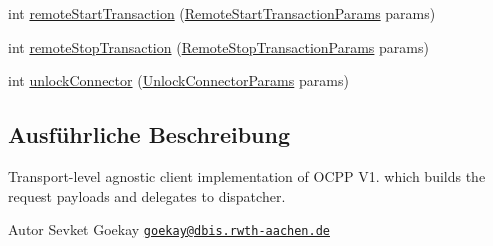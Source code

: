 \begin{DoxyCompactItemize}
\item 
int \hyperlink{classde_1_1rwth_1_1idsg_1_1steve_1_1service_1_1_charge_point_service12___client_a699443166e440f7e34a46206fb2166ef}{remote\-Start\-Transaction} (\hyperlink{classde_1_1rwth_1_1idsg_1_1steve_1_1web_1_1dto_1_1common_1_1_remote_start_transaction_params}{Remote\-Start\-Transaction\-Params} params)
\item 
int \hyperlink{classde_1_1rwth_1_1idsg_1_1steve_1_1service_1_1_charge_point_service12___client_af7c5fa9d8e585e8e061feaf76569de72}{remote\-Stop\-Transaction} (\hyperlink{classde_1_1rwth_1_1idsg_1_1steve_1_1web_1_1dto_1_1common_1_1_remote_stop_transaction_params}{Remote\-Stop\-Transaction\-Params} params)
\item 
int \hyperlink{classde_1_1rwth_1_1idsg_1_1steve_1_1service_1_1_charge_point_service12___client_aba1458ba8f5ec1e90281eb87f795e27c}{unlock\-Connector} (\hyperlink{classde_1_1rwth_1_1idsg_1_1steve_1_1web_1_1dto_1_1common_1_1_unlock_connector_params}{Unlock\-Connector\-Params} params)
\end{DoxyCompactItemize}


\subsection{Ausführliche Beschreibung}
Transport-\/level agnostic client implementation of O\-C\-P\-P V1. which builds the request payloads and delegates to dispatcher.

\begin{DoxyAuthor}{Autor}
Sevket Goekay \href{mailto:goekay@dbis.rwth-aachen.de}{\tt goekay@dbis.\-rwth-\/aachen.\-de} 
\end{DoxyAuthor}


